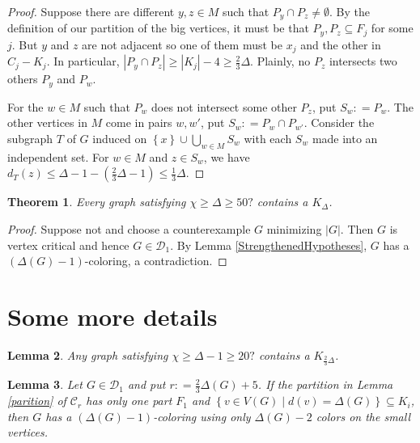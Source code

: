 \documentclass[12pt]{article}
\theoremstyle{plain}
\newtheorem{thm}{Theorem}[section]
\newtheorem{lem}[thm]{Lemma}
\theoremstyle{definition}
\theoremstyle{remark}
\newcommand{\fancy}[1]{\mathcal{#1}}
\newcommand{\C}[1]{\fancy{C}_{#1}}
\newcommand{\set}[1]{\left\{ #1 \right\}}
\newcommand{\setb}[3]{\left\{ #1 \in #2 \mid #3 \right\}}
\newcommand{\card}[1]{\left|#1\right|}
\newcommand{\DefinedAs}{\mathrel{\mathop:}=}
\def\D{\fancy{D}}
\def\C{\fancy{C}}
\newcommand{\bigclique}[1]{\frac{2}{3}\Delta(#1) + 5}
\newcommand{\cliqueparts}{\frac{2}{3}\Delta}
\begin{document}
\begin{proof}
Suppose there are different $y, z \in M$ such that $P_y \cap P_z \neq
\emptyset$.  By the definition of our partition of the big vertices, it must be
that $P_y, P_z \subseteq F_j$ for some $j$.  But $y$ and $z$ are not adjacent so
one of them must be $x_j$ and the other in $C_j - K_j$.  In particular,
$\card{P_y \cap P_z} \geq \card{K_j} - 4 \geq \cliqueparts$. Plainly, no $P_z$
intersects two others $P_y$ and $P_w$.

For the $w \in M$ such that $P_w$ does not intersect some other $P_z$, put $S_w
\DefinedAs P_w$.  The other vertices in $M$ come in pairs $w, w'$, put $S_w \DefinedAs P_w \cap P_{w'}$.  
Consider the subgraph $T$ of $G$ induced on $\set{x} \cup \bigcup_{w \in M}
S_w$ with each $S_w$ made into an independent set. For $w \in M$ and $z \in S_w$, we
have $d_T(z) \leq \Delta - 1 - (\cliqueparts - 1) \leq \frac13 \Delta$.

\end{proof}

\begin{thm}
Every graph satisfying $\chi \geq \Delta \geq 50?$ contains a $K_\Delta$.
\end{thm}
\begin{proof}
Suppose not and choose a counterexample $G$ minimizing $\card{G}$.  Then $G$ is
vertex critical and hence $G \in \D_1$.  By Lemma \ref{StrengthenedHypotheses},
$G$ has a $(\Delta(G) - 1)$-coloring, a contradiction.
\end{proof}

\section{Some more details}
\begin{lem}\label{DeltaMinusOneBigClique}
Any graph satisfying $\chi \geq \Delta - 1 \geq 20?$ contains a $K_{\frac23
\Delta}$.
\end{lem}

\begin{lem}\label{SmallColoringExtension}
Let $G \in \D_1$ and put $r \DefinedAs \bigclique{G}$.  If the partition in
Lemma \ref{parition} of $\C_r$ has only one part $F_1$ and
$\setb{v}{V(G)}{d(v) = \Delta(G)} \subseteq K_i$, then $G$ has a $(\Delta(G) -
1)$-coloring using only $\Delta(G) - 2$ colors on the small vertices.
\end{lem}
\end{document}
